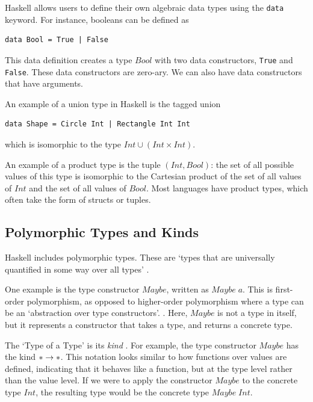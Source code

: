 Haskell allows users to define their own algebraic data types using the \lstinline[language=SFL]|data| keyword. For instance, booleans can be defined as 

\begin{lstlisting}[language=SFL_unboxed_noprelude_notypes]
data Bool = True | False
\end{lstlisting} 

\noindent This data definition creates a type $Bool$ with two data constructors, \verb|True| and \verb|False|. These data constructors are zero-ary. We can also have data constructors that have arguments. 

An example of a union type in Haskell is the tagged union \begin{lstlisting}[language=SFL_unboxed]
data Shape = Circle Int | Rectangle Int Int
\end{lstlisting} 
\noindent which is isomorphic to the type \(Int \cup (Int \times Int)\). 

An example of a product type is the tuple \((Int, Bool)\): the set of all possible values of this type is isomorphic to the Cartesian product of the set of all values of \(Int\) and the set of all values of $Bool$. Most languages have product types, which often take the form of structs or tuples. 

\subsection{Polymorphic Types and Kinds}
Haskell includes polymorphic types. These are `types that are universally quantified in some way over all types' \cite{hudak1992gentle}. 

One example is the type constructor $Maybe$, written as \(Maybe\;a\). This is first-order polymorphism, as opposed to higher-order polymorphism where a type can be an `abstraction over type constructors'. \cite{yallop2014lightweightpoly}. Here, \(Maybe\) is not a type in itself, but it represents a constructor that takes a type, and returns a concrete type. 

The `Type of a Type' is its \emph{kind} \cite{pierce2002types}. For example, the type constructor $Maybe$ has the kind $* \rightarrow *$. This notation looks similar to how functions over values are defined, indicating that it behaves like a function, but at the type level rather than the value level. If we were to apply the constructor \(Maybe\) to the concrete type \(Int\), the resulting type would be the concrete type \(Maybe \;Int\). 

